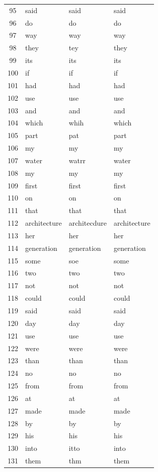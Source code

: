 \begin{longtable}{clll}
    95 & said & said & said \\
    96 & do & do & do \\
    97 & way & way & way \\
    98 & they & tey & they \\
    99 & its & its & its \\
    100 & if & if & if \\
    101 & had & had & had \\
    102 & use & use & use \\
    103 & and & and & and \\
    104 & which & whih & which \\
    105 & part & pat & part \\
    106 & my & my & my \\
    107 & water & watrr & water \\
    108 & my & my & my \\
    109 & first & first & first \\
    110 & on & on & on \\
    111 & that & that & that \\
    112 & architecture & architecdure & architecture \\
    113 & her & her & her \\
    114 & generation & generation & generation \\
    115 & some & soe & some \\
    116 & two & two & two \\
    117 & not & not & not \\
    118 & could & could & could \\
    119 & said & said & said \\
    120 & day & day & day \\
    121 & use & use & use \\
    122 & were & were & were \\
    123 & than & than & than \\
    124 & no & no & no \\
    125 & from & from & from \\
    126 & at & at & at \\
    127 & made & made & made \\
    128 & by & by & by \\
    129 & his & his & his \\
    130 & into & itto & into \\
    131 & them & thm & them \\

\end{longtable}
